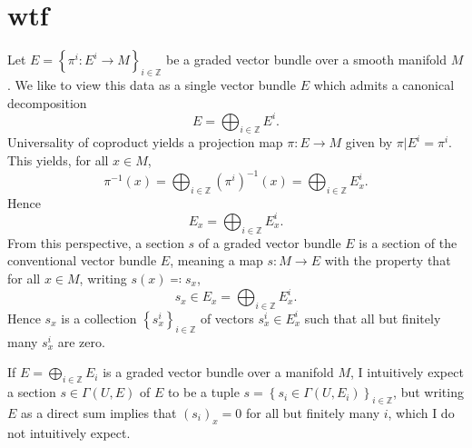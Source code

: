 \section{wtf}

Let $E=\left\{ \pi ^i : E^i\to M \right\} _{i\in\mathbb{Z} } $ be a graded vector bundle over a smooth manifold $M$. We like to view this data as a single vector bundle $E$ which admits a canonical decomposition
\[
	E=\bigoplus_{i\in\mathbb{Z} } E^i
.\]
Universality of coproduct yields a projection map $\pi : E \to M$ given by $\pi |E^i=\pi ^i$. This yields, for all $x\in M$,
\[
	\pi ^{-1} (x) = \bigoplus_{i\in\mathbb{Z} } (\pi ^i )^{-1} (x) = \bigoplus_{i\in\mathbb{Z} } E^i_x
.\]
Hence
\[
	E_x = \bigoplus_{i\in\mathbb{Z} } E_x^i
.\]
From this perspective, a section $s$ of a graded vector bundle $E$ is a section of the conventional vector bundle $E$, meaning a map $s : M \to E$ with the property that for all $x\in M$, writing $s(x) \eqqcolon s_x$,
\[
	s_x\in E_x = \bigoplus_{i\in\mathbb{Z} } E_x^i
.\]
Hence $s_x$ is a collection $\left\{ s_x^i \right\} _{i\in\mathbb{Z} } $ of vectors $s^i_x\in E^i_x$ such that all but finitely many $s_x^i$ are zero.

If $E =\bigoplus_{i\in\mathbb{Z} } E_i$ is a graded vector bundle over a manifold $M$, I intuitively expect a section $s\in \Gamma (U,E)$ of $E$ to be a tuple $s=\left\{ s_i\in \Gamma (U,E_i) \right\}_{i\in\mathbb{Z} } $, but writing $E$ as a direct sum implies that $(s_i)_x=0$ for all but finitely many $i$, which I do not intuitively expect.

